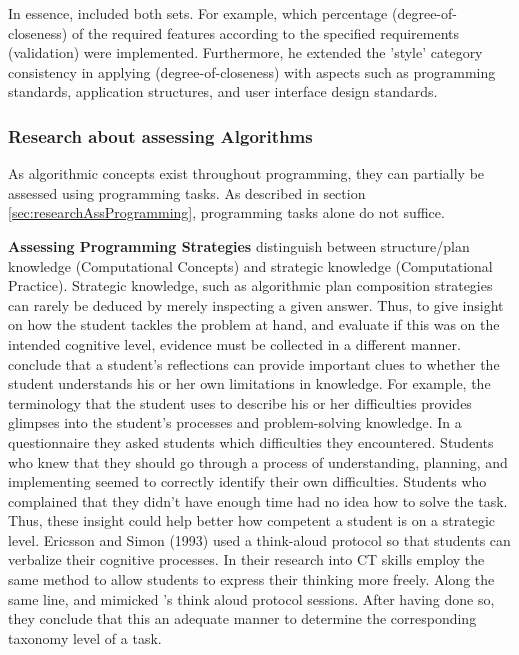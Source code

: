 In essence, \cite{thompson2007holisticAssCriteria} included both sets. For example, which percentage (degree-of-closeness) of the required features according to the specified requirements (validation) were implemented. Furthermore, he extended the 'style' category consistency in applying (degree-of-closeness) with aspects such as programming standards, application structures, and user interface design standards.

\subsubsection{Research about assessing Algorithms}


As algorithmic concepts exist throughout programming, they can partially be assessed using programming tasks. As described in section \ref{sec:researchAssProgramming}, programming tasks alone do not suffice. 




\noindent \textbf{Assessing Programming Strategies}\newline
\cite{BrennanResnick2012} distinguish between structure/plan knowledge (Computational Concepts) and strategic knowledge (Computational Practice). Strategic knowledge, such as algorithmic plan composition strategies can rarely be deduced by merely inspecting a given answer. Thus, to give insight on how the student tackles the problem at hand, and evaluate if this was on the intended cognitive level, evidence must be collected in a different manner. \cite{McCracken2001} conclude that a student's reflections can provide important clues to whether the student understands his or her own limitations in knowledge.  For example, the terminology that the student uses to describe his or her difficulties provides glimpses into the student's processes and problem-solving knowledge. In a questionnaire they asked students which difficulties they encountered. Students who knew that they should go through a process of understanding, planning, and implementing seemed to correctly identify their own difficulties. Students who complained that they didn't have enough time had no idea how to solve the task. Thus, these insight could help better how competent a student is on a strategic level. Ericsson and Simon (1993) used a think-aloud protocol so that students can verbalize their cognitive processes. In their research into CT skills  employ the same method to allow students to express their thinking more freely. Along the same line,  and  mimicked 's think aloud protocol sessions. After having done so, they conclude that this an adequate manner to determine the corresponding taxonomy level of a task.

